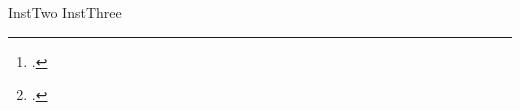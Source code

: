 

\author[\AuthorOneInstIdxs]{\AuthorOneName\thanks{\AuthorOneEmail%
  \ifx\AuthorOneNote\empty\else . \AuthorOneNote\fi
}}
\author[\AuthorTwoInstIdxs]{\AuthorTwoName\thanks{\AuthorTwoEmail%
  \ifx\AuthorTwoNote\empty\else . \AuthorTwoNote\fi
}}

\affil[1]{\InstOne}
\ifcsname InstTwo\endcsname\affil[2]{\InstTwo}\fi
\ifcsname InstThree\endcsname\affil[3]{\InstThree}\fi